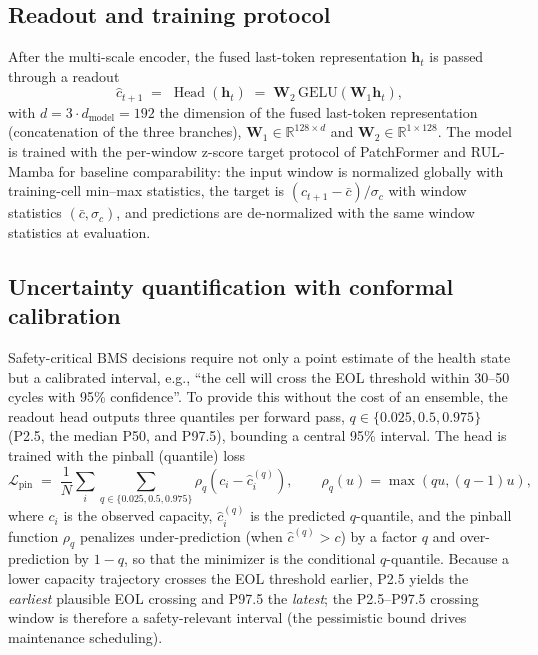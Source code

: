 \subsection{Readout and training protocol}
\label{sec:readout}

After the multi-scale encoder, the fused last-token representation
$\mathbf{h}_{t}$ is passed through a readout
\begin{equation}
\label{eq:head}
\hat{c}_{t+1}
\;=\; \operatorname{Head}(\mathbf{h}_t)
\;=\; \mathbf{W}_2\, \mathrm{GELU}(\mathbf{W}_1 \mathbf{h}_t),
\end{equation}
with $d = 3 \cdot d_{\text{model}} = 192$ the dimension of the fused
last-token representation (concatenation of the three branches),
$\mathbf{W}_1 \in \mathbb{R}^{128 \times d}$ and
$\mathbf{W}_2 \in \mathbb{R}^{1 \times 128}$. The model is trained
with the per-window z-score target protocol of PatchFormer and
RUL-Mamba for baseline comparability: the input window is normalized
globally with training-cell min--max statistics, the target is
$(c_{t+1} - \bar{c})/\sigma_c$ with window statistics
$(\bar{c}, \sigma_c)$, and predictions are de-normalized with the
same window statistics at evaluation.

\subsection{Uncertainty quantification with conformal calibration}
\label{sec:quantile}

Safety-critical BMS decisions require not only a point estimate of
the health state but a calibrated interval, e.g., ``the cell will
cross the EOL threshold within 30--50 cycles with 95\% confidence''.
To provide this without the cost of an ensemble, the readout head
outputs three quantiles per forward pass,
$q \in \{0.025, 0.5, 0.975\}$ (P2.5, the median P50, and P97.5),
bounding a central 95\% interval. The head is trained
with the pinball (quantile) loss
\begin{equation}
\mathcal{L}_{\text{pin}} \;=\;
\frac{1}{N}\sum_{i}\sum_{q \in \{0.025,0.5,0.975\}}
\rho_q\!\left( c_i - \hat{c}_i^{(q)} \right),
\qquad
\rho_q(u) = \max(q u, (q-1) u),
\end{equation}
where $c_i$ is the observed capacity, $\hat{c}_i^{(q)}$ is the
predicted $q$-quantile, and the pinball function $\rho_q$ penalizes
under-prediction (when $\hat{c}^{(q)} > c$) by a factor $q$ and
over-prediction by $1-q$, so that the minimizer is the conditional
$q$-quantile. Because a lower capacity trajectory crosses the EOL
threshold earlier, P2.5 yields the \emph{earliest} plausible EOL
crossing and P97.5 the \emph{latest}; the P2.5--P97.5 crossing
window is therefore a safety-relevant interval (the pessimistic
bound drives maintenance scheduling).

